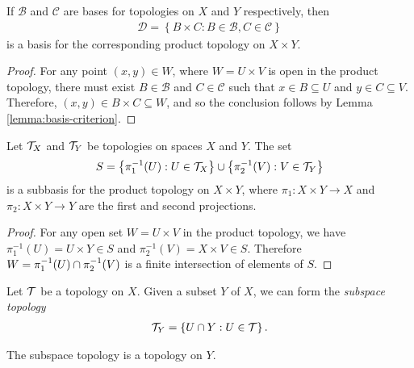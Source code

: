 \begin{thm}
    If $\mathcal{B}$ and $\mathcal{C}$ are bases for topologies on $X$ and $Y$ respectively, then
    \begin{align*}
        \mathcal{D} = \left\{B \times C : B \in \mathcal{B}, C \in \mathcal{C}\right\}
    \end{align*}
    is a basis for the corresponding product topology on $X \times Y$.
\end{thm}

\begin{proof}
    For any point $(x, y) \in W$, where $W = U \times V$ is open in the product topology, there must exist $B \in \mathcal{B}$ and $C \in \mathcal{C}$ such that $x \in B \subseteq U$ and $y \in C \subseteq V$. Therefore, $(x, y) \in B \times C \subseteq W$, and so the conclusion follows by Lemma \ref{lemma:basis-criterion}.
\end{proof}

\begin{thm}
    Let $\mathcal{T}_X$ and $\mathcal{T}_Y$ be topologies on spaces $X$ and $Y$. The set
    \begin{align*}
        S = \left\{\pi_1^{-1}(U) : U \in \mathcal{T}_X\right\} \cup \left\{\pi_2^{-1}(V) : V \in \mathcal{T}_Y\right\}
    \end{align*}
    is a subbasis for the product topology on $X \times Y$, where $\pi_1: X \times Y \to X$ and $\pi_2: X \times Y \to Y$ are the first and second projections. 
\end{thm}

\begin{proof}
    For any open set $W = U \times V$ in the product topology, we have $\pi_1^{-1}(U) = U \times Y \in S$ and $\pi_2^{-1}(V) = X \times V \in S$. Therefore $W = \pi_1^{-1}(U) \cap \pi_2^{-1}(V)$ is a finite intersection of elements of $S$.
\end{proof}

\begin{defn}
    Let $\mathcal{T}$ be a topology on $X$. Given a subset $Y$ of $X$, we can form the \emph{subspace topology}
    \begin{align*}
        \mathcal{T}_Y = \left\{U \cap Y : U \in \mathcal{T}\right\}.
    \end{align*}
\end{defn}

\begin{prop}
    The subspace topology is a topology on $Y$.
\end{prop}

